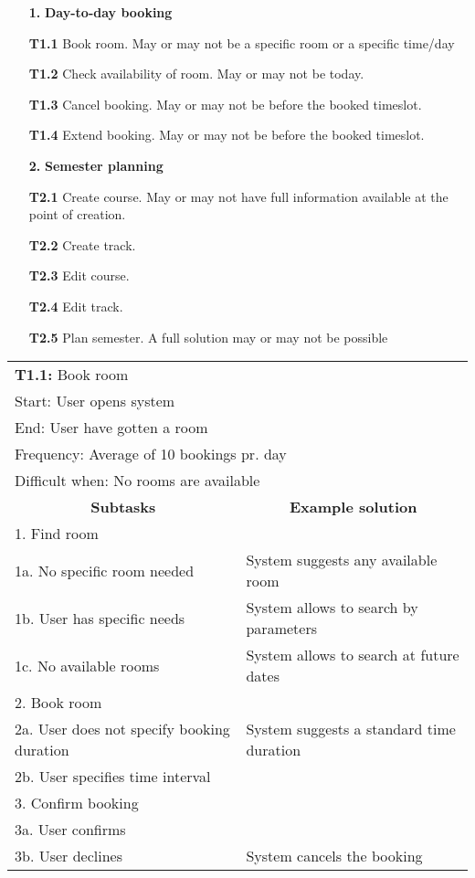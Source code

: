 \begin{itemize}\itemsep1pt
\item[\textbf{1.}] \textbf{Day-to-day booking}
\item[\textbf{T1.1}] Book room. May or may not be a specific room or a specific time/day
\item[\textbf{T1.2}] Check availability of room. May or may not be today.
\item[\textbf{T1.3}] Cancel booking. May or may not be before the booked timeslot.
\item[\textbf{T1.4}] Extend booking. May or may not be before the booked timeslot.
\\
\item[\textbf{2.}] \textbf{Semester planning}
\item[\textbf{T2.1}] Create course. May or may not have full information available at the point of creation.
\item[\textbf{T2.2}] Create track.
\item[\textbf{T2.3}] Edit course.
\item[\textbf{T2.4}] Edit track.
\item[\textbf{T2.5}] Plan semester. A full solution may or may not be possible
\end{itemize}

\begin{tabular}{|p{6cm}|p{6cm}|}
\hline 
	\multicolumn{2}{|l|}{\textbf{T1.1:} \hspace{26mm}Book room} \\
	\multicolumn{2}{|l|}{Start: \hspace{26mm}User opens system } \\
	\multicolumn{2}{|l|}{End: \hspace{28mm}User have gotten a room } \\
	\multicolumn{2}{|l|}{Frequency: \hspace{17mm}Average of 10 bookings pr. day} \\
	\multicolumn{2}{|l|}{Difficult when: \hspace{10mm}No rooms are available } \\ \hline
	\multicolumn{1}{|c|}{\textbf{Subtasks}} & \multicolumn{1}{c|}{\textbf{Example solution}} \\ \hline
	1.  Find room & \\
	1a. No specific room needed & System suggests any available room\\
	1b. User has specific needs & System allows to search by parameters\\
	1c. No available rooms & System allows to search at future dates\\ \hline
	2.  Book room & \\
	2a. User does not specify booking duration & System suggests a standard time duration \\
	2b. User specifies time interval & \\ \hline
	3. Confirm booking & \\
	3a. User confirms & \\
	3b. User declines & System cancels the booking \\ \hline
\end{tabular}

